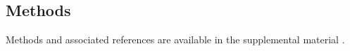\subsection*{Methods}

Methods and associated references are available in the supplemental material
\cite{supplement}.